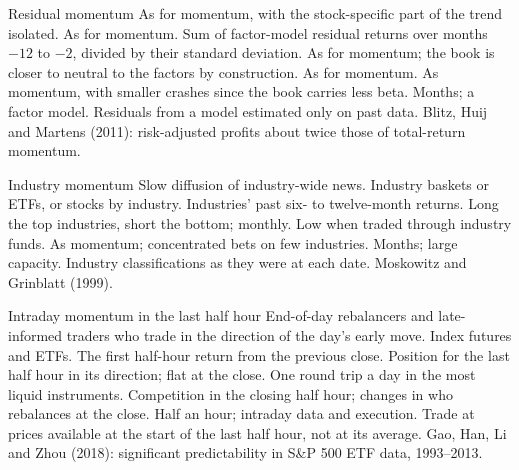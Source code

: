 \begin{strategyfile}{Residual momentum}\label{strat:s1:momentum:residual}
 As for momentum, with the stock-specific part of the trend isolated.
 As for momentum.
 Sum of factor-model residual returns over months $-12$ to $-2$, divided by their standard deviation.
 As for momentum; the book is closer to neutral to the factors by construction.
 As for momentum.
 As momentum, with smaller crashes since the book carries less beta.
 Months; a factor model.
 Residuals from a model estimated only on past data.
 Blitz, Huij and Martens (2011): risk-adjusted profits about twice those of total-return momentum.
\end{strategyfile}

\begin{strategyfile}{Industry momentum}\label{strat:s1:momentum:industry}
 Slow diffusion of industry-wide news.
 Industry baskets or ETFs, or stocks by industry.
 Industries' past six- to twelve-month returns.
 Long the top industries, short the bottom; monthly.
 Low when traded through industry funds.
 As momentum; concentrated bets on few industries.
 Months; large capacity.
 Industry classifications as they were at each date.
 Moskowitz and Grinblatt (1999).
\end{strategyfile}

\begin{strategyfile}{Intraday momentum in the last half hour}\label{strat:s1:momentum:intraday}
 End-of-day rebalancers and late-informed traders who trade in the direction of the day's early move.
 Index futures and ETFs.
 The first half-hour return from the previous close.
 Position for the last half hour in its direction; flat at the close.
 One round trip a day in the most liquid instruments.
 Competition in the closing half hour; changes in who rebalances at the close.
 Half an hour; intraday data and execution.
 Trade at prices available at the start of the last half hour, not at its average.
 Gao, Han, Li and Zhou (2018): significant predictability in S\&P 500 ETF data, 1993--2013.
\end{strategyfile}

